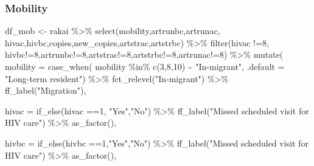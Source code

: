 \documentclass[
  letterpaper,
  DIV=11,
  numbers=noendperiod]{scrartcl}
\newenvironment{Shaded}{\begin{snugshade}}{\end{snugshade}}
\newcommand{\AttributeTok}[1]{\textcolor[rgb]{0.40,0.45,0.13}{#1}}
\newcommand{\DecValTok}[1]{\textcolor[rgb]{0.68,0.00,0.00}{#1}}
\newcommand{\FunctionTok}[1]{\textcolor[rgb]{0.28,0.35,0.67}{#1}}
\newcommand{\NormalTok}[1]{\textcolor[rgb]{0.00,0.23,0.31}{#1}}
\newcommand{\OtherTok}[1]{\textcolor[rgb]{0.00,0.23,0.31}{#1}}
\newcommand{\SpecialCharTok}[1]{\textcolor[rgb]{0.37,0.37,0.37}{#1}}
\newcommand{\StringTok}[1]{\textcolor[rgb]{0.13,0.47,0.30}{#1}}
\begin{document}
\subsubsection{Mobility}\label{mobility}

\begin{Shaded}
\begin{Highlighting}[]
\NormalTok{df\_mob }\OtherTok{\textless{}{-}}\NormalTok{  rakai }\SpecialCharTok{\%\textgreater{}\%} 
  \FunctionTok{select}\NormalTok{(mobility,artrunbc,artrunac,}
\NormalTok{         hivac,hivbc,copies,new\_copies,artstrac,artstrbc) }\SpecialCharTok{\%\textgreater{}\%} 
  \FunctionTok{filter}\NormalTok{(hivac }\SpecialCharTok{!=}\DecValTok{8}\NormalTok{, hivbc}\SpecialCharTok{!=}\DecValTok{8}\NormalTok{,artrunbc}\SpecialCharTok{!=}\DecValTok{8}\NormalTok{,artstrac}\SpecialCharTok{!=}\DecValTok{8}\NormalTok{,artstrbc}\SpecialCharTok{!=}\DecValTok{8}\NormalTok{,artrunac}\SpecialCharTok{!=}\DecValTok{8}\NormalTok{) }\SpecialCharTok{\%\textgreater{}\%} 
  \FunctionTok{mutate}\NormalTok{(}
    \AttributeTok{mobility =} \FunctionTok{case\_when}\NormalTok{(}
\NormalTok{           mobility }\SpecialCharTok{\%in\%} \FunctionTok{c}\NormalTok{(}\DecValTok{3}\NormalTok{,}\DecValTok{8}\NormalTok{,}\DecValTok{10}\NormalTok{) }\SpecialCharTok{\textasciitilde{}} \StringTok{"In{-}migrant"}\NormalTok{,}
           \AttributeTok{.default =} \StringTok{"Long{-}term resident"}\NormalTok{) }\SpecialCharTok{\%\textgreater{}\%} 
           \FunctionTok{fct\_relevel}\NormalTok{(}\StringTok{"In{-}migrant"}\NormalTok{) }\SpecialCharTok{\%\textgreater{}\%} 
           \FunctionTok{ff\_label}\NormalTok{(}\StringTok{"Migration"}\NormalTok{),}
  
    \AttributeTok{hivac =} \FunctionTok{if\_else}\NormalTok{(hivac }\SpecialCharTok{==}\DecValTok{1}\NormalTok{, }\StringTok{"Yes"}\NormalTok{,}\StringTok{"No"}\NormalTok{) }\SpecialCharTok{\%\textgreater{}\%} 
    \FunctionTok{ff\_label}\NormalTok{(}\StringTok{"Missed scheduled visit for HIV care"}\NormalTok{) }\SpecialCharTok{\%\textgreater{}\%} 
      \FunctionTok{as\_factor}\NormalTok{(),}
   
     \AttributeTok{hivbc =} \FunctionTok{if\_else}\NormalTok{(hivbc }\SpecialCharTok{==}\DecValTok{1}\NormalTok{,}\StringTok{"Yes"}\NormalTok{,}\StringTok{"No"}\NormalTok{) }\SpecialCharTok{\%\textgreater{}\%} 
    \FunctionTok{ff\_label}\NormalTok{(}\StringTok{"Missed scheduled visit for HIV care"}\NormalTok{) }\SpecialCharTok{\%\textgreater{}\%} 
    \FunctionTok{as\_factor}\NormalTok{(),}
 

\end{Highlighting}
\end{Shaded}
\end{document}
